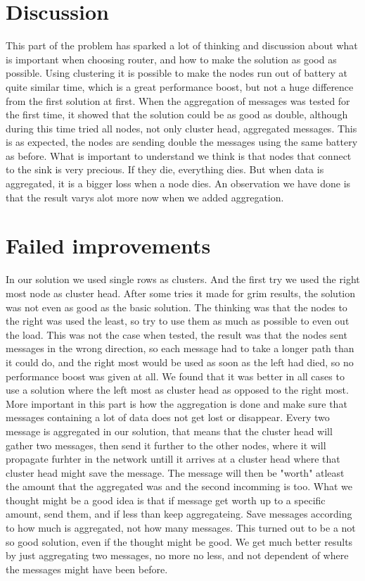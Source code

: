 \documentclass{article}
\begin{document}
  \section{Discussion}
    This part of the problem has sparked a lot of thinking and discussion about what
    is important when choosing router, and how to make the solution as good as possible. 
    Using clustering it is possible to make the nodes run out of battery at quite similar 
    time, which is a great performance boost, but not a huge difference from the first solution
    at first. When the aggregation of messages was tested for the first time, it showed that the
    solution could be as good as double, although during this time tried all nodes, not only
    cluster head, aggregated messages. This is as expected, the nodes are sending double the
    messages using the same battery as before. What is important to understand we think is 
    that nodes that connect to the sink is very precious. If they die, everything dies. 
    But when data is aggregated, it is a bigger loss when a node dies. An observation
    we have done is that the result varys alot more now when we added aggregation. 

  \section{Failed improvements}
    In our solution we used single rows as clusters. And the first try we used the 
    right most node as cluster head. After some tries it made for grim results, the solution 
    was not even as good as the basic solution. The thinking was that the nodes
    to the right was used the least, so try to use them as much as possible to
    even out the load. This was not the case when tested, the result was that
    the nodes sent messages in the wrong direction, so each message had to take a 
    longer path than it could do, and the right most would be used as soon as the
    left had died, so no performance boost was given at all. We found that it
    was better in all cases to use a solution where the left most as cluster head 
    as opposed to the right most. More important in this part is how the aggregation 
    is done and make sure that messages containing a lot of data does not get lost or
    disappear. 
    Every two message is aggregated in our solution, that means that the cluster head will
    gather two messages, then send it further to the other nodes, where it will propagate
    furhter in the network untill it arrives at a cluster head where that cluster head
    might save the message. The message will then be "worth" atleast the amount that 
    the aggregated was and the second incomming is too. What we thought might be a 
    good idea is that if message get worth up to a specific amount, send them, and 
    if less than keep aggregateing. Save messages according to how much is aggregated, 
    not how many messages. This turned out to be a not so good solution, even if the 
    thought might be good. We get much better results by just aggregating two messages,
    no more no less, and not dependent of where the messages might have been before.
\end{document}
